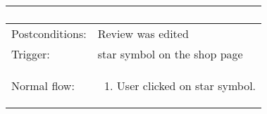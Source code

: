 \begin{longtable}{| p{3.5cm} | p{9cm} |}
\begin{enumerate}
\end{enumerate}\\
\hline
Postconditions: & Review was edited \\
\hline
Trigger: &  star symbol on the shop page\\
\hline
Normal flow: &\mbox{}\par\vspace{-\baselineskip}
\begin{enumerate}
\item User clicked on star symbol.
\end{enumerate}\\
\hline
\end{longtable}





